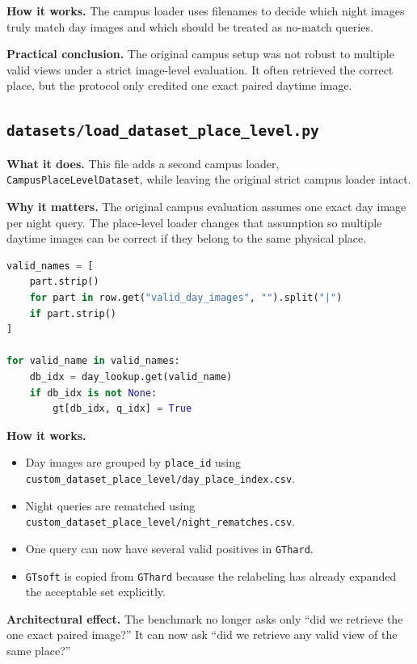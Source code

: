 \documentclass[11pt]{article}
\newcommand{\file}[1]{\texttt{#1}}
\begin{document}
\textbf{How it works.} The campus loader uses filenames to decide which night images truly match day images and which should be treated as no-match queries.

\textbf{Practical conclusion.} The original campus setup was not robust to multiple valid views under a strict image-level evaluation. It often retrieved the correct place, but the protocol only credited one exact paired daytime image.

\subsection{\file{datasets/load\_dataset\_place\_level.py}}
\textbf{What it does.} This file adds a second campus loader, \texttt{CampusPlaceLevelDataset}, while leaving the original strict campus loader intact.

\textbf{Why it matters.} The original campus evaluation assumes one exact day image per night query. The place-level loader changes that assumption so multiple daytime images can be correct if they belong to the same physical place.

\begin{lstlisting}[style=repo, language=Python, caption={Place-level GT construction expands one query into multiple valid positives}]
valid_names = [
    part.strip()
    for part in row.get("valid_day_images", "").split("|")
    if part.strip()
]

for valid_name in valid_names:
    db_idx = day_lookup.get(valid_name)
    if db_idx is not None:
        gt[db_idx, q_idx] = True
\end{lstlisting}

\textbf{How it works.}
\begin{itemize}[leftmargin=*]
  \item Day images are grouped by \texttt{place\_id} using \file{custom\_dataset\_place\_level/day\_place\_index.csv}.
  \item Night queries are rematched using \file{custom\_dataset\_place\_level/night\_rematches.csv}.
  \item One query can now have several valid positives in \texttt{GThard}.
  \item \texttt{GTsoft} is copied from \texttt{GThard} because the relabeling has already expanded the acceptable set explicitly.
\end{itemize}

\textbf{Architectural effect.} The benchmark no longer asks only ``did we retrieve the one exact paired image?'' It can now ask ``did we retrieve any valid view of the same place?''
\end{document}
